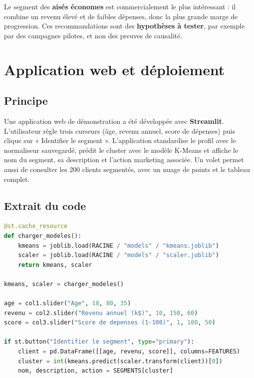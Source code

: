 \documentclass[11pt,a4paper]{article}
\begin{document}
Le segment des \textbf{aisés économes} est commercialement le plus intéressant : il combine un revenu élevé et de faibles dépenses, donc la plus grande marge de progression. Ces recommandations sont des \textbf{hypothèses à tester}, par exemple par des campagnes pilotes, et non des preuves de causalité.

\section{Application web et déploiement}

\subsection{Principe}
Une application web de démonstration a été développée avec \textbf{Streamlit}. L'utilisateur règle trois curseurs (âge, revenu annuel, score de dépenses) puis clique sur « Identifier le segment ». L'application standardise le profil avec le normaliseur sauvegardé, prédit le cluster avec le modèle K-Means et affiche le nom du segment, sa description et l'action marketing associée. Un volet permet aussi de consulter les 200 clients segmentés, avec un nuage de points et le tableau complet.

\subsection{Extrait du code}
\begin{lstlisting}[language=Python]
@st.cache_resource
def charger_modeles():
    kmeans = joblib.load(RACINE / "models" / "kmeans.joblib")
    scaler = joblib.load(RACINE / "models" / "scaler.joblib")
    return kmeans, scaler

kmeans, scaler = charger_modeles()

age = col1.slider("Age", 18, 80, 35)
revenu = col2.slider("Revenu annuel (k$)", 10, 150, 60)
score = col3.slider("Score de depenses (1-100)", 1, 100, 50)

if st.button("Identifier le segment", type="primary"):
    client = pd.DataFrame([[age, revenu, score]], columns=FEATURES)
    cluster = int(kmeans.predict(scaler.transform(client))[0])
    nom, description, action = SEGMENTS[cluster]
\end{lstlisting}
\end{document}
